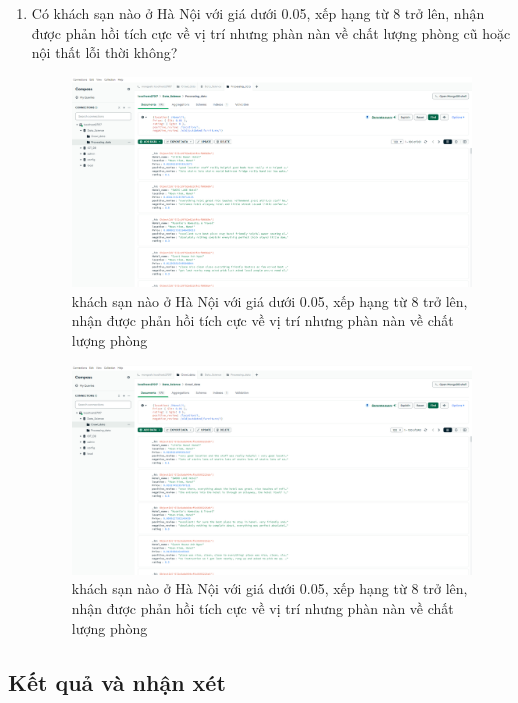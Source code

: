 \begin{enumerate}
    \item Có khách sạn nào ở Hà Nội với giá dưới 0.05, xếp hạng từ 8 trở lên, nhận được phản hồi tích cực về vị trí nhưng phàn nàn về chất lượng phòng cũ hoặc nội thất lỗi thời không?

    \begin{figure}[H]
        \centering
        \includegraphics[width=0.9\linewidth]{Figures/11.12.png}
        \caption{khách sạn nào ở Hà Nội với giá dưới 0.05, xếp hạng từ 8 trở lên, nhận được phản hồi tích cực về vị trí nhưng phàn nàn về chất lượng phòng}
    \end{figure}

    \begin{figure}[H]
        \centering
        \includegraphics[width=0.9\linewidth]{Figures/11.13.png}
        \caption{khách sạn nào ở Hà Nội với giá dưới 0.05, xếp hạng từ 8 trở lên, nhận được phản hồi tích cực về vị trí nhưng phàn nàn về chất lượng phòng}
    \end{figure}

\end{enumerate}

\subsection{Kết quả và nhận xét}

